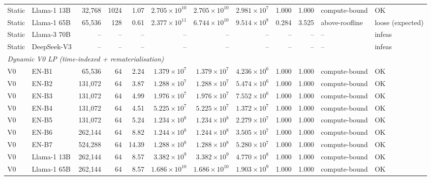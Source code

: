 \begin{table}[ht!]
{\begin{tabular}{llrrrrrrrrll}
Static & Llama-1 13B & 32{,}768  & 1024 & 1.07  & $2.705\times10^{10}$& $2.705\times10^{10}$& $2.981\times10^{7}$ & 1.000 & 1.000 & compute-bound   & OK \\
Static & Llama-1 65B & 65{,}536  & 128  & 0.61  & $2.377\times10^{11}$& $6.744\times10^{10}$& $9.514\times10^{8}$ & 0.284 & 3.525 & above-roofline  & loose (expected) \\
Static & Llama-3 70B & --         & --    & --     & --                   & --                   & --                   & --     & --     & --               & infeas \\
Static & DeepSeek-V3 & --         & --    & --     & --                   & --                   & --                   & --     & --     & --               & infeas \\
\midrule
\multicolumn{12}{l}{\textit{Dynamic V0 LP (time-indexed + rematerialisation)}} \\
\midrule
V0 & EN-B1       & 65{,}536  & 64  &  2.24 & $1.379\times10^{7}$ & $1.379\times10^{7}$ & $4.236\times10^{6}$ & 1.000 & 1.000 & compute-bound & OK \\
V0 & EN-B2       & 131{,}072 & 64  &  3.87 & $1.288\times10^{7}$ & $1.288\times10^{7}$ & $5.474\times10^{6}$ & 1.000 & 1.000 & compute-bound & OK \\
V0 & EN-B3       & 131{,}072 & 64  &  4.99 & $1.976\times10^{7}$ & $1.976\times10^{7}$ & $7.552\times10^{6}$ & 1.000 & 1.000 & compute-bound & OK \\
V0 & EN-B4       & 131{,}072 & 64  &  4.51 & $5.225\times10^{7}$ & $5.225\times10^{7}$ & $1.372\times10^{7}$ & 1.000 & 1.000 & compute-bound & OK \\
V0 & EN-B5       & 131{,}072 & 64  &  5.24 & $1.234\times10^{8}$ & $1.234\times10^{8}$ & $2.279\times10^{7}$ & 1.000 & 1.000 & compute-bound & OK \\
V0 & EN-B6       & 262{,}144 & 64  &  8.82 & $1.244\times10^{8}$ & $1.244\times10^{8}$ & $3.505\times10^{7}$ & 1.000 & 1.000 & compute-bound & OK \\
V0 & EN-B7       & 524{,}288 & 64  & 14.39 & $1.288\times10^{8}$ & $1.288\times10^{8}$ & $5.280\times10^{7}$ & 1.000 & 1.000 & compute-bound & OK \\
V0 & Llama-1 13B & 262{,}144 & 64  &  8.57 & $3.382\times10^{9}$ & $3.382\times10^{9}$ & $4.770\times10^{8}$ & 1.000 & 1.000 & compute-bound & OK \\
V0 & Llama-1 65B & 262{,}144 & 64  &  8.57 & $1.686\times10^{10}$& $1.686\times10^{10}$& $1.903\times10^{9}$ & 1.000 & 1.000 & compute-bound & OK \\

\end{tabular}}
\end{table}
